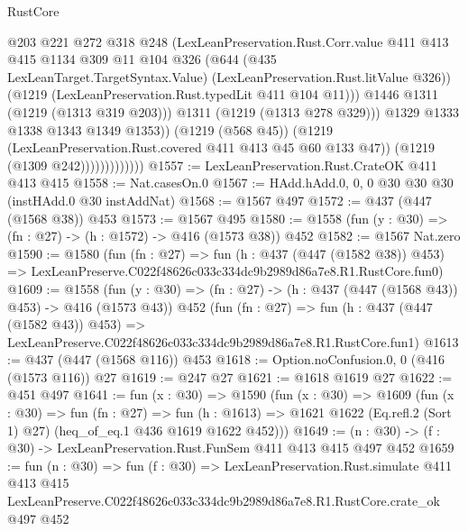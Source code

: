 \begin{lexlean}{RustCore}
\begin{coremodule}
                                  @203
                                  @221
                                  @272
                                  @318
                                  @248
                                  (LexLeanPreservation.Rust.Corr.value
                                    @411
                                    @413
                                    @415
                                    @1134
                                    @309
                                    @11
                                    @104
                                    @326
                                    (@644
                                      (@435 LexLeanTarget.TargetSyntax.Value)
                                      (LexLeanPreservation.Rust.litValue @326))
                                    (@1219 (LexLeanPreservation.Rust.typedLit @411 @104 @11)))
                                  @1446
                                  @1311
                                  (@1219 (@1313 @319 @203)))
                                @1311
                                (@1219 (@1313 @278 @329)))
                              @1329
                              @1333
                              @1338
                              @1343
                              @1349
                              @1353))
                          (@1219 (@568 @45))
                          (@1219 (LexLeanPreservation.Rust.covered @411 @413 @45 @60 @133 @47))
                          (@1219 (@1309 @242)))))))))))))
@1557 := LexLeanPreservation.Rust.CrateOK @411 @413 @415
@1558 := Nat.casesOn.{0}
@1567 := HAdd.hAdd.{0, 0, 0} @30 @30 @30 (instHAdd.{0} @30 instAddNat)
@1568 := @1567 @497
@1572 := @437 (@447 (@1568 @38)) @453
@1573 := @1567 @495
@1580 := @1558 (fun (y : @30) => (fn : @27) -> (h : @1572) -> @416 (@1573 @38)) @452
@1582 := @1567 Nat.zero
@1590 := @1580
    (fun (fn : @27) =>
    fun (h : @437 (@447 (@1582 @38)) @453) =>
    LexLeanPreserve.C022f48626c033c334dc9b2989d86a7e8.R1.RustCore.fun0)
@1609 := @1558
    (fun (y : @30) => (fn : @27) -> (h : @437 (@447 (@1568 @43)) @453) -> @416 (@1573 @43))
    @452
    (fun (fn : @27) =>
    fun (h : @437 (@447 (@1582 @43)) @453) =>
    LexLeanPreserve.C022f48626c033c334dc9b2989d86a7e8.R1.RustCore.fun1)
@1613 := @437 (@447 (@1568 @116)) @453
@1618 := Option.noConfusion.{0, 0} (@416 (@1573 @116)) @27
@1619 := @247 @27
@1621 := @1618 @1619 @27
@1622 := @451 @497
@1641 := fun (x : @30) =>
  @1590
    (fun (x : @30) =>
    @1609
      (fun (x : @30) =>
      fun (fn : @27) =>
      fun (h : @1613) =>
      @1621 @1622 (Eq.refl.{2} (Sort 1) @27) (heq_of_eq.{1} @436 @1619 @1622 @452)))
@1649 := (n : @30) -> (f : @30) -> LexLeanPreservation.Rust.FunSem @411 @413 @415 @497 @452
@1659 := fun (n : @30) =>
  fun (f : @30) =>
  LexLeanPreservation.Rust.simulate
    @411
    @413
    @415
    LexLeanPreserve.C022f48626c033c334dc9b2989d86a7e8.R1.RustCore.crate_ok
    @497
    @452
\end{coremodule}
\end{lexlean}
